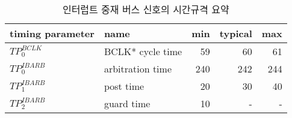 %
%
\begin{table}[htbp]
\caption{인터럽트 중재 버스 신호의 시간규격 요약}\label{table:ibarb-time}
   \begin{center}
   \begin{tabular}{|l|l|r|r|r|} \hline
	timing parameter & name & min & typical & max \\ \hline \hline
	$TP^{BCLK}_0$  & BCLK* cycle time & 59 & 60 & 61 \\ \hline
	$TP^{IBARB}_0$  & arbitration time & 240 & 242 & 244 \\ \hline
	$TP^{IBARB}_1$  & post time & 20 & 30 & 40 \\ \hline
	$TP^{IBARB}_2$  & guard time & 10 & - & - \\ \hline
   \end{tabular}
   \end{center}
\end{table}
%
%
